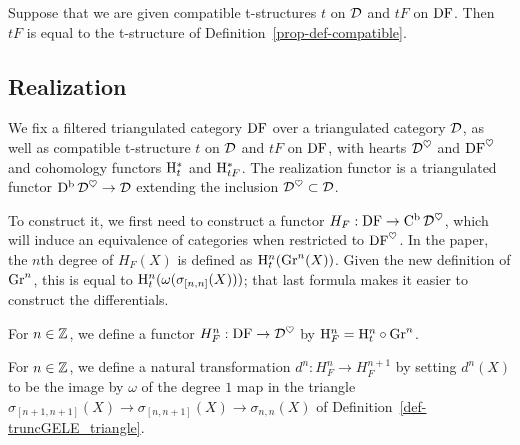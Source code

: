 \begin{proposition}
\label{prop-compatible-uniq}
\leanok
{}
Suppose that we are given compatible t-structures $t$ on $\mathcal{D}$ and $tF$ on $\operatorname{DF}$. Then $tF$ is equal to the
t-structure of Definition~\ref{prop-def-compatible}.

\end{proposition}


\subsection{Realization}

We fix a filtered triangulated category $\operatorname{DF}$ over a triangulated category $\mathcal{D}$, as well
as compatible t-structure $t$ on $\mathcal{D}$ and $tF$ on $\operatorname{DF}$, with hearts $\mathcal{D}^\heartsuit$ and
$\operatorname{DF}^\heartsuit$ and cohomology functors $\mathrm{H}^*_t$ and $\mathrm{H}^*_{tF}$. The realization functor is a 
triangulated functor $\operatorname{\mathrm{D}^b} \mathcal{D}^\heartsuit\to\mathcal{D}$ extending the inclusion $\mathcal{D}^\heartsuit\subset\mathcal{D}$.

To construct it, we first need to construct a functor $H_F : \operatorname{DF} \to \operatorname{\mathrm{C}^b} \mathcal{D}^\heartsuit$, which
will induce an equivalence of categories when restricted to $\operatorname{DF}^\heartsuit$.
In the paper, the $n$th degree of $H_F(X)$ is defined as $\mathrm{H}^n_t(\operatorname{Gr}^n(X))$.
Given the new definition of $\operatorname{Gr}^n$, this is equal to $\mathrm{H}^n_t(\omega(\sigma_{[n,n]}(X)))$;
that last formula makes it easier to construct the differentials.

\begin{definition}
\label{def-HF-deg}
\leanok
{}
For $n\in\mathbb{Z}$, we define a functor $H_F^n:\operatorname{DF}\to \mathcal{D}^\heartsuit$ by 
$\mathrm{H}_F^n=\mathrm{H}^n_t\circ\operatorname{Gr}^n$.

\end{definition}

\begin{definition}
\label{def-HF-diff}
\leanok
{}
For $n\in\mathbb{Z}$, we define a natural transformation $d^n : H_F^n\to H_F^{n+1}$ by
setting $d^n(X)$ to be the image by $\omega$ of the degree $1$ map in the
triangle $\sigma_{[n+1,n+1]}(X)\to\sigma_{[n,n+1]}(X)\to\sigma_{{n,n}}(X)$
of Definition~\ref{def-truncGELE_triangle}.

\end{definition}

